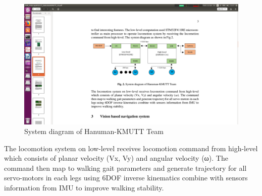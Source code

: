\begin{figure}[H]
	\centering
	\includegraphics[width=\textwidth,trim={20cm 15cm 10cm 12.5cm},clip]{image/sysDiagram.png}
	\caption{System diagram of Hanuman-KMUTT Team}
	\label{fig:sysDiagram}
\end{figure}
The locomotion system on low-level receives locomotion command from high-level
which consists of planar velocity (Vx, Vy) and angular velocity (ω). The command
then map to walking gait parameters and generate trajectory for all servo-motors in each
legs using 6DOF inverse kinematics combine with sensors information from IMU to
improve walking stability.